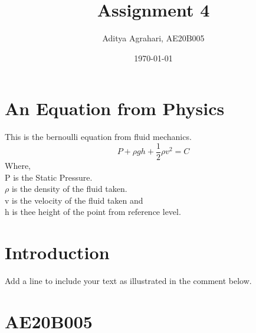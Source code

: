 \documentclass[a4paper, 12pt]{article}
\begin{document}
\title{Assignment 4}
\author{Aditya Agrahari, AE20B005}
\date{\today}
\maketitle
\section{An Equation from Physics}
This is the bernoulli equation from fluid mechanics.
\begin{equation}
    P + \rho gh +\frac{1}{2}\rho v^2 = C
\end{equation}
Where,\\
P is the Static Pressure.\\
$\rho$ is the density of the fluid taken.\\
v is the velocity of the fluid taken and\\
h is thee height of the point from reference level.

\section{Introduction}
Add a line to include your text as illustrated in the comment below.

% 
\section{AE20B005}

\end{document}
